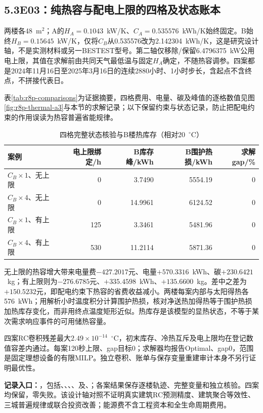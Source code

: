 \subsection*{5.3\quad E03：纯热容与配电上限的四格及状态账本}
两楼各48~m$^2$；A的$H_A=0.1043$~kW/K、$C_A=0.535576$~kWh/K始终固定。B始终$H_B=0.15645$~kW/K，仅将$C_B$从0.535576改为2.142304~kWh/K，这是研究设计轴，不是实测材料或另一BESTEST型号。第二轴仅移除/保留6.4796375~kW公用电上限，其值在求解前由共同天气最低温与固定$H_A$确定，不随热容调参。四案都是2024年11月16日至2025年3月16日的连续2880小时、1小时步长，含起点不含终点，不拼接代表日。

表\ref{tab:r8p-comparisons}为证据摘要，四格费用、电量、碳及峰值的逐格数值见图\ref{fig:r8p-thermal-a3}与本节的求解记录；以下保留约束与状态记录，防止把配电约束的作用误读为热容普遍省能规律。

\begin{table}[H]
\centering
\caption{四格完整状态核验与B楼热库存（相对20~$^\circ$C）}
\begin{tabularx}{\linewidth}{@{}Yrrrr@{}}
\toprule
案例 & 电上限绑定/h & B库存峰/kWh & B围护热损/kWh & 求解gap/\%\\\midrule
$C_B\times1$、无上限 & 0 & 3.7490 & 5554.19 & 0\\
$C_B\times4$、无上限 & 0 & 14.9961 & 6124.52 & 0\\
$C_B\times1$、有上限 & 125 & 3.3461 & 5481.96 & 0\\
$C_B\times4$、有上限 & 530 & 11.2114 & 5871.36 & 0\\
\bottomrule
\end{tabularx}
\end{table}

无上限的热容增大带来电量费$-427.2017$元、电量$+570.3316$~kWh、碳$+230.6421$~kg；有上限则为$-276.6785$元、$+335.4598$~kWh、$+135.6600$~kg。差中之差为$+150.5232$元，即配电约束下热容的省费收益减小。两楼每案内部与太阳得热各576~kWh；用解析小时温度积分计算围护热损，核对净送热加得热等于围护热损加热库存变化，而非用终点温度矩形近似。热库存是该模型的显热状态，不等于某次需求响应事件的可用储热容量。

四案RC卷积残差最大$2.49\times10^{-14}$~$^\circ$C，初末库存、冷热互斥及电上限均在登记数值容差内通过。每案120秒上限、gap目标0；求解器均报告Optimal、gap0，范围是固定理想设备的有限MILP。独立卷积、账单与保存变量重建审计本身不另行证明最优性。

\noindent\textbf{记录入口：}，包括、、、、及、；各案结果保存逐楼轨迹、完整变量和独立核验。四案均保留，零失败。该设计轴对照不证明真实建筑RC预测精度、建筑聚合等效性、三城普遍规律或联合投资改善；能源费不含工程资本和全生命周期费用。

